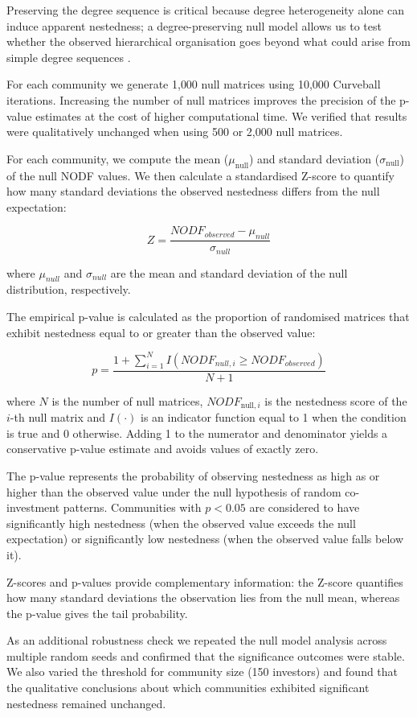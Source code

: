 Preserving the degree sequence is critical because degree heterogeneity alone can induce apparent nestedness; a degree-preserving null model allows us to test whether the observed hierarchical organisation goes beyond what could arise from simple degree sequences \cite{Ulrich2007,Dormann2009}.

For each community we generate 1{,}000 null matrices using 10{,}000 Curveball iterations. Increasing the number of null matrices improves the precision of the p-value estimates at the cost of higher computational time. We verified that results were qualitatively unchanged when using 500 or 2{,}000 null matrices.

For each community, we compute the mean ($\mu_{\mathrm{null}}$) and standard deviation ($\sigma_{\mathrm{null}}$) of the null NODF values. We then calculate a standardised Z-score to quantify how many standard deviations the observed nestedness differs from the null expectation:

\begin{equation}
Z = \frac{NODF_{observed} - \mu_{null}}{\sigma_{null}}
\end{equation}

where $\mu_{null}$ and $\sigma_{null}$ are the mean and standard deviation of the null distribution, respectively.

The empirical p-value is calculated as the proportion of randomised matrices that exhibit nestedness equal to or greater than the observed value:

\begin{equation}
p = \frac{1 + \sum_{i=1}^{N} I(NODF_{null,i} \geq NODF_{observed})}{N + 1}
\end{equation}

where $N$ is the number of null matrices, $NODF_{\mathrm{null},i}$ is the nestedness score of the $i$-th null matrix and $I(\cdot)$ is an indicator function equal to 1 when the condition is true and 0 otherwise. Adding 1 to the numerator and denominator yields a conservative p-value estimate and avoids values of exactly zero.

The p-value represents the probability of observing nestedness as high as or higher than the observed value under the null hypothesis of random co-investment patterns. Communities with $p<0.05$ are considered to have significantly high nestedness (when the observed value exceeds the null expectation) or significantly low nestedness (when the observed value falls below it).

Z-scores and p-values provide complementary information: the Z-score quantifies how many standard deviations the observation lies from the null mean, whereas the p-value gives the tail probability.

As an additional robustness check we repeated the null model analysis across multiple random seeds and confirmed that the significance outcomes were stable. We also varied the threshold for community size (150 investors) and found that the qualitative conclusions about which communities exhibited significant nestedness remained unchanged.

\pagebreak